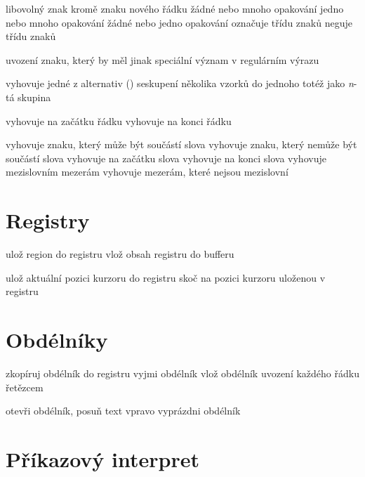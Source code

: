  libovolný znak kromě znaku nového řádku
\key{*} žádné nebo mnoho opakování
\key{+} jedno nebo mnoho opakování
 žádné nebo jedno opakování
\key{[$\ldots$]} označuje třídu znaků
\key{[\^{}$\ldots$]} neguje třídu znaků

 uvození znaku, který by měl jinak speciální význam v
regulárním výrazu

\key{$\ldots$\\|$\ldots$\\|$\ldots$} vyhovuje jedné z alternativ ()
\key{\\( $\ldots$ \\)} seskupení několika vzorků do jednoho
 totéž jako {\it n\/}-tá skupina

\key{\^{}} vyhovuje na začátku řádku
\key{\$} vyhovuje na konci řádku

\key{\\w} vyhovuje znaku, který může být součástí slova
\key{\\W} vyhovuje znaku, který nemůže být součástí slova
\key{\\<} vyhovuje na začátku slova
\key{\\>} vyhovuje na konci slova
\key{\\b} vyhovuje mezislovním mezerám
\key{\\B} vyhovuje mezerám, které nejsou mezislovní

\section{Registry}

 ulož region do registru
 vlož obsah registru do bufferu

 ulož aktuální pozici kurzoru do registru
 skoč na pozici kurzoru uloženou v registru

\section{Obdélníky}

 zkopíruj obdélník do registru
 vyjmi obdélník
 vlož obdélník
 uvození každého řádku řetězcem

 otevři obdélník, posuň text vpravo
 vyprázdni obdélník

\section{Příkazový interpret}


